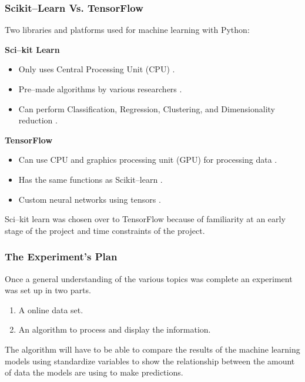 \documentclass{beamer}
\begin{document}
\begin{frame}
\frametitle{Scikit--Learn Vs. TensorFlow}
\footnotesize
Two libraries and platforms used for machine learning with Python:
\newline

\textbf{Sci--kit Learn}
\begin{itemize}
\item Only uses Central Processing Unit (CPU) \cite{pythonML}.
\item Pre--made algorithms by various researchers \cite{SciKit}.
\item Can perform Classification, Regression, Clustering, and Dimensionality reduction \cite{SciKit}.
\end{itemize}

\textbf{TensorFlow}
\begin{itemize}
\item Can use CPU and graphics processing unit (GPU) for processing data \cite{pythonML}.
\item Has the same functions as Scikit--learn \cite{pythonML}.
\item Custom neural networks using tensors \cite{pythonML}.
\end{itemize}
 Sci--kit learn was chosen over to TensorFlow because of familiarity at an early stage of the project and time constraints of the project.
\end{frame}

\begin{frame}
\frametitle{The Experiment's Plan}

Once a general understanding of the various topics was complete an experiment was set up in two parts.
\newline

\begin{enumerate}
\item A online data set.
\item An algorithm to process and display the information.
\end{enumerate}

The algorithm will have to be able to compare the results of the machine learning models using standardize variables to show the relationship between the amount of data the models are using to make predictions.

\end{frame}
\end{document}
